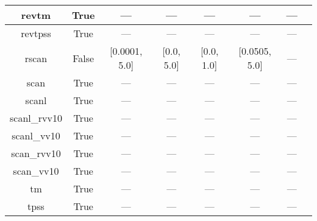 \begin{tabular}{|c|c|c|c|c|c|c|l|}
        revtm &                  True &              --- &              --- &           --- &            --- &        --- &                                                               \cite{Jana2019_6356} \\ \hline
      revtpss &                  True &              --- &              --- &           --- &            --- &        --- &                                     \cite{Perdew2009_026403,Perdew2009_026403_err} \\ \hline
        rscan &                 False &    [0.0001, 5.0] &       [0.0, 5.0] &    [0.0, 1.0] &  [0.0505, 5.0] &        --- &                                                           \cite{Bartok2019_161101} \\ \hline
         scan &                  True &              --- &              --- &           --- &            --- &        --- &                                                              \cite{Sun2015_036402} \\ \hline
        scanl &                  True &              --- &              --- &           --- &            --- &        --- &                            \cite{Mejia2017_052512,Mejia2018_115161,Sun2015_036402} \\ \hline
 scanl\_rvv10 &                  True &              --- &              --- &           --- &            --- &        --- &                           \cite{Mejia2017_052512,Mejia2018_115161,Peng2016_041005} \\ \hline
  scanl\_vv10 &                  True &              --- &              --- &           --- &            --- &        --- &                    \cite{Mejia2017_052512,Mejia2018_115161,Brandenburg2016_115144} \\ \hline
  scan\_rvv10 &                  True &              --- &              --- &           --- &            --- &        --- &                                                             \cite{Peng2016_041005} \\ \hline
   scan\_vv10 &                  True &              --- &              --- &           --- &            --- &        --- &                                                      \cite{Brandenburg2016_115144} \\ \hline
           tm &                  True &              --- &              --- &           --- &            --- &        --- &                                                              \cite{Tao2016_073001} \\ \hline
         tpss &                  True &              --- &              --- &           --- &            --- &        --- &                                              \cite{Tao2003_146401,Perdew2004_6898} \\ \hline

\end{tabular}
